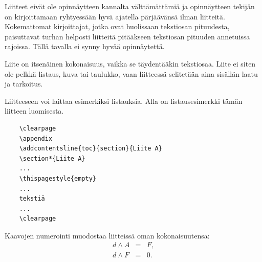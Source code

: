 \documentclass[english,12pt,a4paper,pdftex]{article}
\begin{document}
\clearpage



\renewcommand{\theequation}{A\arabic{equation}}
\setcounter{equation}{0}
\renewcommand{\thefigure}{A\arabic{figure}}
\setcounter{figure}{0}
\renewcommand{\thetable}{A\arabic{table}}
\setcounter{table}{0}

Liitteet eivät ole opinnäytteen kannalta välttämättämiä ja
opinnäytteen tekijän on
kirjoittamaan ryhtyessään hyvä ajatella pärjäävänsä ilman liitteitä.
Kokemattomat kirjoittajat, jotka ovat huolissaan
tekstiosan pituudesta, paisuttavat turhan
helposti liitteitä pitääkseen tekstiosan pituuden annetuissa rajoissa.
Tällä tavalla ei synny hyvää opinnäytettä.

Liite on itsenäinen kokonaisuus, vaikka se täydentääkin tekstiosaa.
Liite ei siten ole pelkkä listaus, kuva tai taulukko, vaan
liitteessä selitetään aina sisällän laatu ja tarkoitus.

Liitteeseen voi laittaa esimerkiksi listauksia. Alla on
listausesimerkki tämän liitteen luomisesta.

\begin{verbatim}
	\clearpage
	\appendix
	\addcontentsline{toc}{section}{Liite A}
	\section*{Liite A}
	...
	\thispagestyle{empty}
	...
	tekstiä
	...
	\clearpage
\end{verbatim}

Kaavojen numerointi muodostaa liitteissä oman kokonaisuutensa:
\begin{eqnarray}
d \wedge A  &=& F, \label{liitekaava1}\\
d \wedge F  &=& 0. \label{liitekaava2}
\end{eqnarray}


\clearpage
\end{document}
